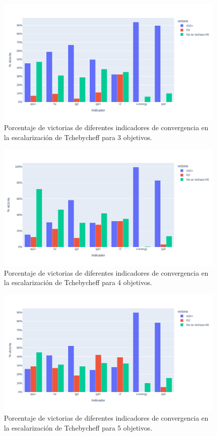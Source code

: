 \begin{figure} [H]
    \centering
\includegraphics[width=\textwidth]{Figuras/R2_vs_IGDp_nobj3.pdf}
\caption[IGD+ vs R2 3 objetivos]{Porcentaje de victorias de diferentes indicadores de convergencia en la escalarización de Tchebycheff para 3 objetivos.}
\label{fig:R2_vs_IGDp_3}
\end{figure}

\begin{figure} [H]
    \centering
\includegraphics[width=\textwidth]{Figuras/R2_vs_IGDp_nobj4.pdf}
\caption[IGD+ vs R2 4 objetivos]{Porcentaje de victorias de diferentes indicadores de convergencia en la escalarización de Tchebycheff para 4 objetivos.}
\label{fig:R2_vs_IGDp_4}
\end{figure}

\begin{figure} [H]
    \centering
\includegraphics[width=\textwidth]{Figuras/R2_vs_IGDp_nobj5.pdf}
\caption[IGD+ vs R2 5 objetivos]{Porcentaje de victorias de diferentes indicadores de convergencia en la escalarización de Tchebycheff para 5 objetivos.}
\label{fig:R2_vs_IGDp_5}
\end{figure}


